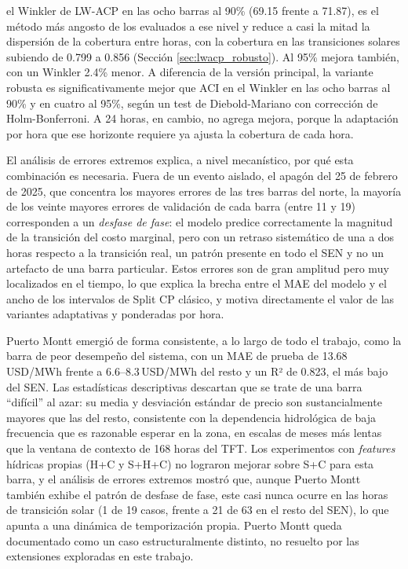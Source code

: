 el Winkler de LW-ACP en las ocho barras al 90\% (69.15 frente a 71.87), es el método más angosto de los evaluados a ese nivel y reduce a casi la mitad la dispersión de la cobertura entre horas, con la cobertura en las transiciones solares subiendo de 0.799 a 0.856 (Sección \ref{sec:lwacp_robusto}). Al 95\% mejora también, con un Winkler 2.4\% menor. A diferencia de la versión principal, la variante robusta es significativamente mejor que ACI en el Winkler en las ocho barras al 90\% y en cuatro al 95\%, según un test de Diebold-Mariano con corrección de Holm-Bonferroni. A 24 horas, en cambio, no agrega mejora, porque la adaptación por hora que ese horizonte requiere ya ajusta la cobertura de cada hora.

El análisis de errores extremos explica, a nivel mecanístico, por qué esta combinación es necesaria. Fuera de un evento aislado, el apagón del 25 de febrero de 2025, que concentra los mayores errores de las tres barras del norte, la mayoría de los veinte mayores errores de validación de cada barra (entre 11 y 19) corresponden a un \textit{desfase de fase}: el modelo predice correctamente la magnitud de la transición del costo marginal, pero con un retraso sistemático de una a dos horas respecto a la transición real, un patrón presente en todo el SEN y no un artefacto de una barra particular. Estos errores son de gran amplitud pero muy localizados en el tiempo, lo que explica la brecha entre el MAE del modelo y el ancho de los intervalos de Split CP clásico, y motiva directamente el valor de las variantes adaptativas y ponderadas por hora.

Puerto Montt emergió de forma consistente, a lo largo de todo el trabajo, como la barra de peor desempeño del sistema, con un MAE de prueba de 13.68\,USD/MWh frente a 6.6--8.3\,USD/MWh del resto y un R² de 0.823, el más bajo del SEN. Las estadísticas descriptivas descartan que se trate de una barra ``difícil'' al azar: su media y desviación estándar de precio son sustancialmente mayores que las del resto, consistente con la dependencia hidrológica de baja frecuencia que es razonable esperar en la zona, en escalas de meses más lentas que la ventana de contexto de 168 horas del TFT. Los experimentos con \textit{features} hídricas propias (H+C y S+H+C) no lograron mejorar sobre S+C para esta barra, y el análisis de errores extremos mostró que, aunque Puerto Montt también exhibe el patrón de desfase de fase, este casi nunca ocurre en las horas de transición solar (1 de 19 casos, frente a 21 de 63 en el resto del SEN), lo que apunta a una dinámica de temporización propia. Puerto Montt queda documentado como un caso estructuralmente distinto, no resuelto por las extensiones exploradas en este trabajo.

